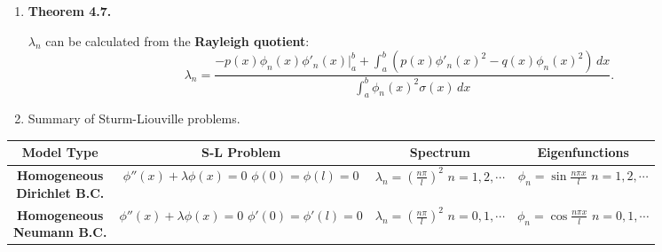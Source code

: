 \begin{enumerate}
\item \textbf{Theorem 4.7.} 

$\lambda _{n}$ can be calculated from the \textbf{Rayleigh quotient}:
\[
\lambda_{n} = \frac{ \displaystyle -p(x)\phi_{n}(x)\phi'_{n}(x)\Big|_{a}^{b} + \int_{a}^{b}(p(x)\phi'_{n}(x)^{2} - q(x)\phi_{n}(x)^{2}) \, dx }{ \displaystyle \int_{a}^{b}\phi_{n}(x)^{2}\sigma(x)\, dx}.
\]

\newpage
\item Summary of Sturm-Liouville problems.

\end{enumerate}

\begin{center}\small
\begin{tabular}{|c|c|c|c|}
    \hline
    \parbox[c][30pt]{90pt}{\centering \textbf{Model Type}} & 
    \parbox[c][30pt]{90pt}{\centering \textbf{S-L Problem}} & \parbox[t]{90pt}{\centering \textbf{Spectrum}} & 
    \parbox[c][30pt]{90pt}{\centering \textbf{Eigenfunctions}} \\
    \hline
    
    \parbox[c][30pt]{90pt}{\centering \textbf{Homogeneous \\ \vspace{10pt} Dirichlet B.C.}} & 
    \parbox[c][60pt]{90pt}{\centering $\phi''(x) + \lambda \phi(x)=0$ \\ \vspace{10pt} $\phi(0)=\phi(l)=0$}
    & 
    \parbox[c][60pt]{90pt}{\centering $\displaystyle \lambda_{n}=\left( \frac{n\pi}{l} \right)^{2}$ \\ \vspace{10pt} $n=1, 2, \cdots$} & 
    \parbox[c][60pt]{90pt}{\centering $\displaystyle \phi_{n} = \sin\frac{n\pi x}{l}$ \\ \vspace{10pt} $n=1, 2, \cdots$} \\
    \hline 
    
    \parbox[c][30pt]{90pt}{\centering \textbf{Homogeneous \\ \vspace{10pt} Neumann B.C.}} & 
    \parbox[c][60pt]{90pt}{\centering $\phi''(x) + \lambda \phi(x)=0$ \\ \vspace{10pt} $\phi'(0)=\phi'(l)=0$}
    & 
    \parbox[c][60pt]{90pt}{\centering $\displaystyle \lambda_{n}=\left( \frac{n\pi}{l} \right)^{2}$ \\ \vspace{10pt} $n=0, 1, \cdots$} & 
    \parbox[c][60pt]{90pt}{\centering $\displaystyle \phi_{n} = \cos\frac{n\pi x}{l}$ \\ \vspace{10pt} $n=0, 1, \cdots$} \\
    \hline
    

\end{tabular}
\end{center}
